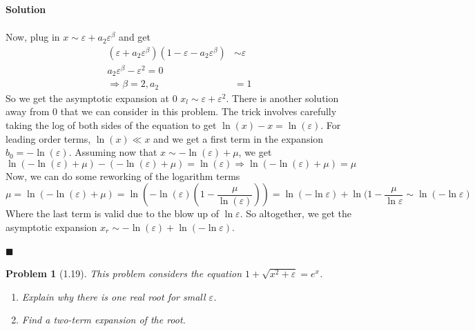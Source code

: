 \documentclass[11pt]{article}
\newcommand{\vep}{\varepsilon}
\theoremstyle{problemstyle}
\newtheorem{problem}{Problem}
\newenvironment{solution}
  {\noindent\textbf{Solution}\quad}
  {\hfill$\blacksquare$\par\vspace{1em}}
\begin{document}
\begin{solution}
\begin{enumerate}
\begin{align*}
      \end{align*}
      Now, plug in $x \sim \vep + a_2 \vep^\beta$ and get
      \begin{align*}
        (\vep + a_2\vep^\beta)(1 - \vep - a_2\vep^\beta) & \sim \vep \\
        a_2 \vep^\beta - \vep^2 = 0 \\
        \Rightarrow \beta = 2, a_2 & = 1
      \end{align*}
      So we get the asymptotic expansion at 0 $x_l \sim \vep + \vep^2$. There is
      another solution away from $0$ that we can consider in this problem. The
      trick involves carefully taking the log of both sides of the equation to
      get $\ln(x) - x = \ln(\vep)$. For leading order terms, $\ln(x) \ll x$ and
      we get a first term in the expansion $b_0 = -\ln(\vep)$. Assuming now that
      $x \sim -\ln(\vep) + \mu$, we get
      \[ \ln\left(-\ln(\vep) + \mu\right) - \left(-\ln(\vep) + \mu\right) =
      \ln(\vep) \Rightarrow \ln\left(-\ln(\vep) + \mu\right) = \mu \]
      Now, we can do some reworking of the logarithm terms
      \[ \mu = \ln(-\ln(\vep) + \mu) = \ln\left(-\ln(\vep)(1 -
      \frac{\mu}{\ln(\vep)})\right) = \ln(-\ln\vep) + \ln(1 -
      \frac{\mu}{\ln\vep} \sim \ln(-\ln\vep) \]
      Where the last term is valid due to the blow up of $\ln\vep$. So
      altogether, we get the asymptotic expansion $x_r \sim -\ln(\vep)
      +\ln(-\ln\vep)$.
  \end{enumerate}
\end{solution}

\newpage
\begin{problem}[1.19]
  This problem considers the equation $1 + \sqrt{x^2 + \vep} = e^x$.
  \begin{enumerate}
    \item Explain why there is one real root for small $\vep$.
    \item Find a two-term expansion of the root.
  \end{enumerate}
\end{problem}
\end{document}
